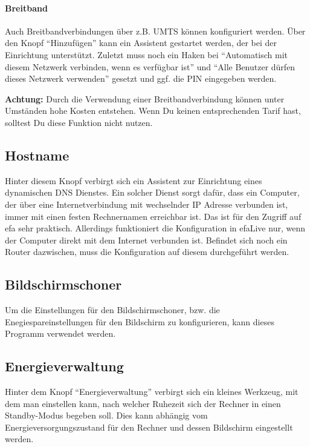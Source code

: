 \documentclass[a4paper,12pt,twoside]{article}
\begin{document}
\paragraph{Breitband}
\label{breitband}
Auch Breitbandverbindungen über z.B. UMTS können konfiguriert werden.
Über den Knopf "`Hinzufügen"' kann ein
Assistent gestartet werden, der bei der Einrichtung unterstützt.
Zuletzt muss noch ein Haken bei "`Automatisch mit diesem Netzwerk 
verbinden, wenn es verfügbar ist"' und "`Alle Benutzer dürfen 
dieses Netzwerk verwenden"' gesetzt und ggf. die PIN eingegeben werden.

\bigskip
\textbf{Achtung:} Durch die Verwendung einer Breitbandverbindung können unter
Umständen hohe Kosten entstehen. Wenn Du keinen entsprechenden Tarif
hast, solltest Du diese Funktion nicht nutzen.
\bigskip

\subsection{Hostname}
\label{sct:ddns}
Hinter diesem Knopf verbirgt sich ein Assistent zur Einrichtung eines
dynamischen DNS Dienstes. Ein solcher Dienst sorgt dafür, dass ein
Computer, der über eine Internetverbindung mit wechselnder IP Adresse
verbunden ist, immer mit einen festen Rechnernamen erreichbar ist. Das
ist für den Zugriff auf efa sehr praktisch. Allerdings funktioniert die
Konfiguration in efaLive nur, wenn der Computer direkt mit dem Internet
verbunden ist. Befindet sich noch ein Router dazwischen, muss die
Konfiguration auf diesem durchgeführt werden.


\subsection{Bildschirmschoner}
\label{bildschirmschoner}
Um die Einstellungen für den Bildschirmschoner, bzw. die
Enegiespareinstellungen für den Bildschirm zu konfigurieren, kann
dieses Programm verwendet werden.


\subsection{Energieverwaltung}
\label{sct:power_management}
Hinter dem Knopf "`Energieverwaltung"' verbirgt sich ein kleines Werkzeug, 
mit dem man einstellen kann, nach welcher Ruhezeit sich der Rechner in einen 
Standby-Modus begeben soll. Dies kann abhängig vom Energieversorgungszustand 
für den Rechner und dessen Bildschirm eingestellt werden.
\end{document}
